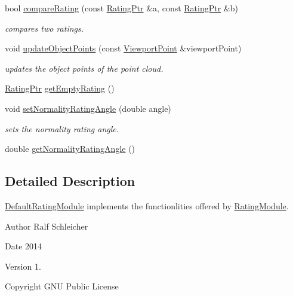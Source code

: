 \begin{DoxyCompactItemize}
bool \hyperlink{classnext__best__view_1_1DefaultRatingModule_a6a9afecd2a1afad09f033f02a8713c32}{compare\-Rating} (const \hyperlink{namespacenext__best__view_a24cf26ec1dec2cc4c167e32798d1abeb}{\-Rating\-Ptr} \&a, const \hyperlink{namespacenext__best__view_a24cf26ec1dec2cc4c167e32798d1abeb}{\-Rating\-Ptr} \&b)
\begin{DoxyCompactList}\small\item\em compares two ratings. \end{DoxyCompactList}\item 
void \hyperlink{classnext__best__view_1_1DefaultRatingModule_a24f23ffbf9df77c40b535405d4dd528b}{update\-Object\-Points} (const \hyperlink{namespacenext__best__view_adc2a48dc71f39dea04334b16d75a8e34}{\-Viewport\-Point} \&viewport\-Point)
\begin{DoxyCompactList}\small\item\em updates the object points of the point cloud. \end{DoxyCompactList}\item 
\hyperlink{namespacenext__best__view_a24cf26ec1dec2cc4c167e32798d1abeb}{\-Rating\-Ptr} \hyperlink{classnext__best__view_1_1DefaultRatingModule_ab4a7962b0caf0197b51591d0147832f1}{get\-Empty\-Rating} ()
\item 
void \hyperlink{classnext__best__view_1_1DefaultRatingModule_a569ec32a0515a1acc44c41d45896dbf0}{set\-Normality\-Rating\-Angle} (double angle)
\begin{DoxyCompactList}\small\item\em sets the normality rating angle. \end{DoxyCompactList}\item 
double \hyperlink{classnext__best__view_1_1DefaultRatingModule_ae8acb4e3622a54370ea2e60fd919fb9f}{get\-Normality\-Rating\-Angle} ()
\end{DoxyCompactItemize}


\subsection{\-Detailed \-Description}
\hyperlink{classnext__best__view_1_1DefaultRatingModule}{\-Default\-Rating\-Module} implements the functionlities offered by \hyperlink{classnext__best__view_1_1RatingModule}{\-Rating\-Module}. 

\begin{DoxyAuthor}{\-Author}
\-Ralf \-Schleicher 
\end{DoxyAuthor}
\begin{DoxyDate}{\-Date}
2014 
\end{DoxyDate}
\begin{DoxyVersion}{\-Version}
1. 
\end{DoxyVersion}
\begin{DoxyCopyright}{\-Copyright}
\-G\-N\-U \-Public \-License 
\end{DoxyCopyright}


